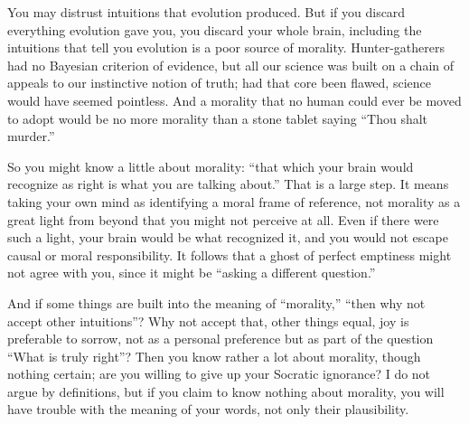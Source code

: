 You may distrust intuitions that evolution produced. But if you discard everything evolution gave you, you discard your whole brain, including the intuitions that tell you evolution is a poor source of morality. Hunter-gatherers had no Bayesian criterion of evidence, but all our science was built on a chain of appeals to our instinctive notion of truth; had that core been flawed, science would have seemed pointless. And a morality that no human could ever be moved to adopt would be no more morality than a stone tablet saying ``Thou shalt murder.''

So you might know a little about morality: ``that which your brain would recognize as right is what you are talking about.''  That is a large step. It means taking your own mind as identifying a moral frame of reference, not morality as a great light from beyond that you might not perceive at all. Even if there were such a light, your brain would be what recognized it, and you would not escape causal or moral responsibility. It follows that a ghost of perfect emptiness might not agree with you, since it might be ``asking a different question.'' 

And if some things are built into the meaning of ``morality,'' ``then why not accept other intuitions''? Why not accept that, other things equal, joy is preferable to sorrow, not as a personal preference but as part of the question ``What is truly right''?  Then you know rather a lot about morality, though nothing certain; are you willing to give up your Socratic ignorance? I do not argue by definitions, but if you claim to know nothing about morality, you will have trouble with the meaning of your words, not only their plausibility.
